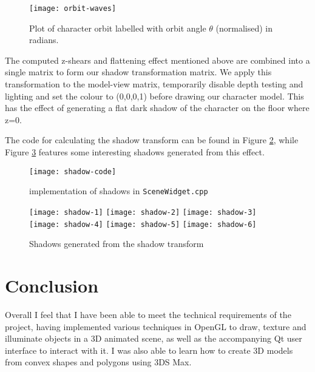 \documentclass{article}
\begin{document}
		\noindent
		\begin{minipage}{\textwidth}
			\begin{figure}[H]
				\centering	
				\texttt{[image: orbit-waves]}
				\caption{Plot of character orbit labelled with orbit angle $\theta$ (normalised) in radians.}
				\label{orbit-waves}
			\end{figure}
		\end{minipage}

		\bigskip
				
		The computed z-shears and flattening effect mentioned above are combined into a single matrix to form
		our shadow transformation matrix. We apply this transformation to the model-view matrix, temporarily
		disable depth testing and lighting and set the colour to (0,0,0,1) before drawing our character model.
		This has the effect of generating a flat dark shadow of the character on the floor where z=0.
		
		\bigskip
		
		The code for calculating the shadow transform can be found in Figure \ref{shadow-code}, while Figure \ref{shadow-reel}
		features some interesting shadows generated from this effect.
		
		\bigskip

		\begin{figure}[H]
			\centering	
			\texttt{[image: shadow-code]}
			\caption{implementation of shadows in \texttt{SceneWidget.cpp}}
			\label{shadow-code}
		\end{figure}
		
		\begin{figure}[H]
			\centering	
			\texttt{[image: shadow-1]}
			\texttt{[image: shadow-2]}
			\texttt{[image: shadow-3]}
			\texttt{[image: shadow-4]}
			\texttt{[image: shadow-5]}
			\texttt{[image: shadow-6]}
			\caption{Shadows generated from the shadow transform}
			\label{shadow-reel}
		\end{figure}

	\clearpage
	\section{Conclusion}
	Overall I feel that I have been able to meet the technical requirements of the project, having implemented various
	techniques in OpenGL to draw, texture and illuminate objects in a 3D animated scene, as well as the accompanying
	Qt user interface to interact with it. I was also able to learn how to create 3D models from convex shapes and polygons
	using 3DS Max.
	
\end{document}
